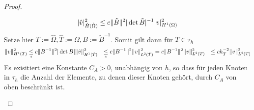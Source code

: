 \begin{proof}
\begin{enumerate}
    \begin{equation*}
      |\hat{v}|^2_{\hat{H}(\hat{\Omega})} \leq c \|\tilde{B}\|^2 |\det \tilde{B}|^{-1} |v|^2_{H^1(\Omega)}
    \end{equation*}
    Setze hier $T:=\hat{\Omega}, \hat{T}:=\Omega, B:=\tilde{B}^{-1}$. Somit gilt dann für $T\in\tau_h$
    \begin{align}
      \|v\|^2_{H^1(T)} &\underset{*}{\leq} c\|B^{-1}\|^2 |\det B| \|\hat{v}\|^2_{H^1(\hat{T})}
      &\underset{*}{\leq} c\|B^{-1}\|^2 \|v\|^2_{L^2(\hat{T})}
      &= c\|B^{-1}\|^2 \|v\|^2_{L^2(T)}
      &\leq c h^{-2}_T \|v\|^2_{L^2(T)}
      \label{}
    \end{align}
    Es exisitiert eine Konstante $C_A>0$, unabhängig von $h$, so dass für jeden Knoten in $\tau_h$ die Anzahl der Elemente, zu denen dieser Knoten gehört, durch $C_A$ von oben beschränkt ist. 
  \end{enumerate}
\end{proof}
